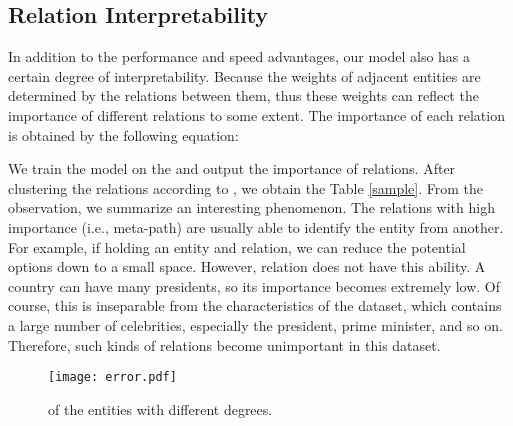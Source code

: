 \documentclass[sigconf]{acmart}
\begin{document}
\subsection{Relation Interpretability}
\begin{table}[t]
\center
{}
\caption{Relation examples of different importance.}
\label{sample}
\end{table}

In addition to the performance and speed advantages, our model also has a certain degree of interpretability.
Because the weights of adjacent entities are determined by the relations between them, thus these weights can reflect the importance of different relations to some extent.
The importance of each relation is obtained by the following equation:

We train the model on the  and output the importance  of relations.
After clustering the relations according to , we obtain the Table \ref{sample}.
From the observation, we summarize an interesting phenomenon.
The relations with high importance (i.e., meta-path) are usually able to identify the entity from another.
For example, if holding an  entity and  relation, we can reduce the potential options down to a small space.
However,  relation does not have this ability. A country can have many presidents, so its importance becomes extremely low.
Of course, this is inseparable from the characteristics of the  dataset, which contains a large number of celebrities, especially the president, prime minister, and so on.
Therefore, such kinds of relations become unimportant in this dataset.

\begin{figure}
  \centering
  \texttt{[image: error.pdf]}
  \caption{ of the entities with different degrees.}\label{Figure:error}
\end{figure}
\end{document}
